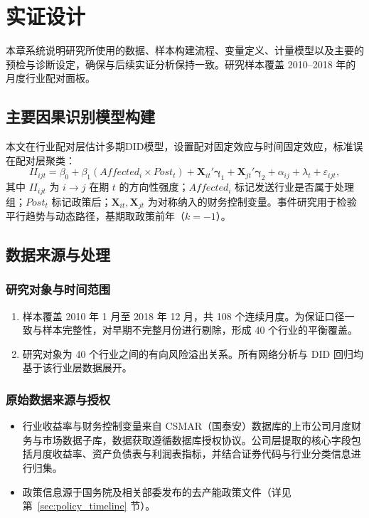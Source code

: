 \chapter{实证设计}
\label{chapter:data_method}

本章系统说明研究所使用的数据、样本构建流程、变量定义、计量模型以及主要的预检与诊断设定，确保与后续实证分析保持一致。研究样本覆盖 2010--2018 年的月度行业配对面板。

\section{主要因果识别模型构建}
\label{sec:design_model}
本文在行业配对层估计多期DID模型，设置配对固定效应与时间固定效应，标准误在配对层聚类：
\begin{equation}
\label{eq:did_baseline_ch4}
II_{ijt} = \beta_0 + \beta_1 (Affected_i \times Post_t) + \bm{X}_{it}'\bm{\gamma}_1 + \bm{X}_{jt}'\bm{\gamma}_2 + \alpha_{ij} + \lambda_t + \varepsilon_{ijt},
\end{equation}
其中 $II_{ijt}$ 为 $i\to j$ 在期 $t$ 的方向性强度；$Affected_i$ 标记发送行业是否属于处理组；$Post_t$ 标记政策后；$\bm{X}_{it},\bm{X}_{jt}$ 为对称纳入的财务控制变量。事件研究用于检验平行趋势与动态路径，基期取政策前年（$k=-1$）。

\section{数据来源与处理}
\label{sec:data_source}

\subsection{研究对象与时间范围}
\begin{enumerate}
    \item 样本覆盖 2010 年 1 月至 2018 年 12 月，共 108 个连续月度。为保证口径一致与样本完整性，对早期不完整月份进行剔除，形成 40 个行业的平衡覆盖。
    \item 研究对象为 40 个行业之间的有向风险溢出关系。所有网络分析与 DID 回归均基于该行业层数据展开。
\end{enumerate}

\subsection{原始数据来源与授权}
\begin{itemize}
    \item 行业收益率与财务控制变量来自 CSMAR（国泰安）数据库的上市公司月度财务与市场数据子库，数据获取遵循数据库授权协议。公司层提取的核心字段包括月度收益率、资产负债表与利润表指标，并结合证券代码与行业分类信息进行归集。
    \item 政策信息源于国务院及相关部委发布的去产能政策文件（详见第~\ref{sec:policy_timeline} 节）。
\end{itemize}

